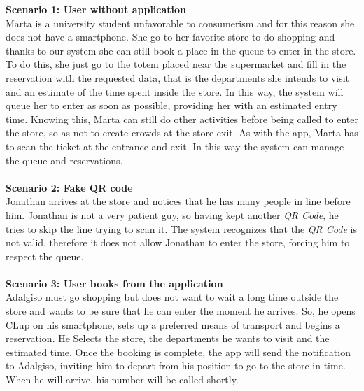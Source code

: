 \documentclass{article}
\begin{document}
			{\bfseries Scenario 1: User without application} \\
			Marta is a university student unfavorable to consumerism and for this reason she does not have a smartphone. She go to her favorite store to do shopping and thanks to our system she can still book a place in the queue to enter in the store. To do this, she just go to the totem placed near the supermarket and fill in the reservation with the requested data, that is the departments she intends to visit and an estimate of the time spent inside the store. In this way, the system will queue her to enter as soon as possible, providing her with an estimated entry time. Knowing this, Marta can still do other activities before being called to enter the store, so as not to create crowds at the store exit. As with the app, Marta has to scan the ticket at the  entrance and exit. In this way the system can manage the queue and reservations. \\ \\
			{\bfseries Scenario 2: Fake QR code} \\
			Jonathan arrives at the store and notices that he has many people in line before him. Jonathan is not a very patient guy, so having kept another \emph{QR Code}, he tries to skip the line trying to scan it. The system recognizes that the \emph{QR Code} is not valid, therefore it does not allow Jonathan to enter the store, forcing him to respect the queue. \\ \\
			{\bfseries Scenario 3: User books from the application} \\
			Adalgiso must go shopping but does not want to wait a long time outside the store and wants to be sure that he can enter the moment he arrives. So, he opens CLup on his smartphone, sets up a preferred means of transport and begins a reservation. He Selects the store, the departments he wants to visit and the estimated time. Once the booking is complete, the app will send the notification to Adalgiso, inviting him to depart from his position to go to the store in time. When he will arrive, his number will be called shortly.
		\newpage
\end{document}
